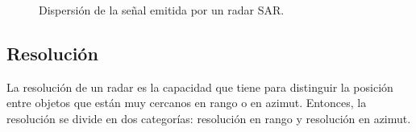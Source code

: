 \begin{figure}[H]
	\centering    
	\caption{\label{SeñalDispersada}Dispersión de la señal emitida por un radar SAR.} %
\end{figure} 
%
\subsection{Resolución}

La resolución de un radar es la capacidad que tiene para distinguir la posición entre objetos que están muy cercanos en rango o en azimut. Entonces, la resolución se divide en dos categorías: resolución en rango y resolución en azimut. 

